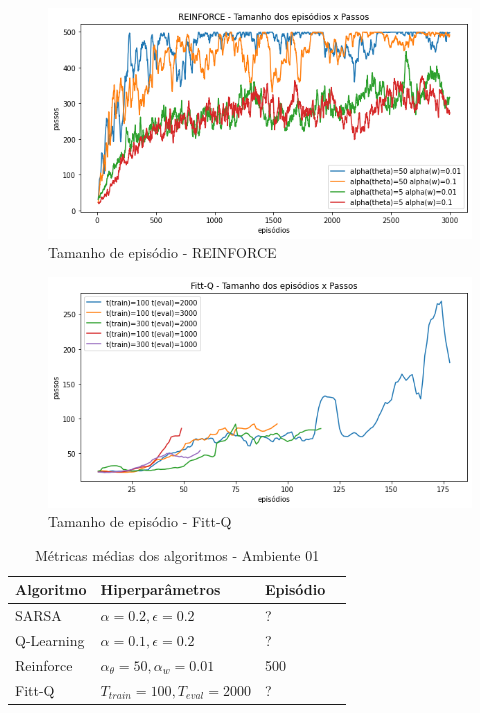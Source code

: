 \documentclass[letterpaper]{article}
\begin{document}
\begin{figure}[t]
  \centering
  \includegraphics[width=0.9\columnwidth]{exp-reinforce-episodes}
  \caption{Tamanho de episódio - REINFORCE}
  \label{fig:exp-reinforce-episodes}
\end{figure}

\begin{figure}[t]
  \centering
  \includegraphics[width=0.9\columnwidth]{exp-fittq-episodes}
  \caption{Tamanho de episódio - Fitt-Q}
  \label{fig:exp-fittq-episodes}
\end{figure}


\begin{table}[ht]
  \caption{Métricas médias dos algoritmos - Ambiente 01}
  \label{table:mean-performance-values-env01}
  \begin{tabular}{llll}
      \toprule
      Algoritmo  &                           Hiperparâmetros & Episódio \\
      \midrule
      SARSA      &          $ \alpha = 0.2, \epsilon = 0.2 $ &        ? \\
      Q-Learning &          $ \alpha = 0.1, \epsilon = 0.2 $ &        ? \\
      Reinforce  & $ \alpha_{\theta} = 50, \alpha_w = 0.01 $ &      500 \\
      Fitt-Q     & $ T_{train} = 100, T_{eval} = 2000 $      &        ? \\
      \bottomrule
  \end{tabular}
\end{table}
\end{document}
